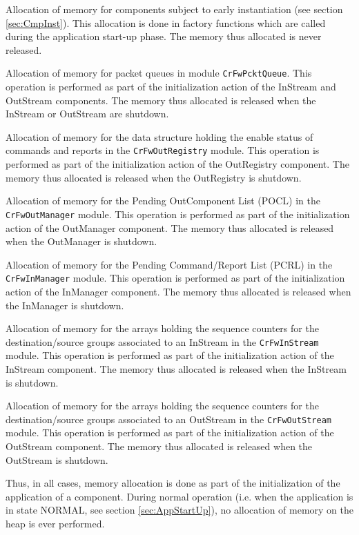 \documentclass[a4paper,10pt]{article}
\newenvironment{fw_itemize}						%
{\begin{itemize}
  \setlength{\itemsep}{1mm}
  \setlength{\parskip}{0pt}
  \setlength{\parsep}{0pt}}
{\end{itemize}}
\begin{document}
\begin{fw_itemize}
\item Allocation of memory for components subject to early instantiation (see section \ref{sec:CmpInst}). This allocation is done in factory functions which are called during the application start-up phase. The memory thus allocated is never released.
\item Allocation of memory for packet queues in module \texttt{CrFwPcktQueue}. This operation is performed as part of the initialization action of the InStream and OutStream components. The memory thus allocated is released when the InStream or OutStream are shutdown.
\item Allocation of memory for the data structure holding the enable status of commands and reports in the \texttt{CrFwOutRegistry} module. This operation is performed as part of the initialization action of the OutRegistry component. The memory thus allocated is released when the OutRegistry is shutdown.
\item Allocation of memory for the Pending OutComponent List (POCL) in the \texttt{CrFwOutManager} module. This operation is performed as part of the initialization action of the OutManager component. The memory thus allocated is released when the OutManager is shutdown.
\item Allocation of memory for the Pending Command/Report List (PCRL) in the \texttt{CrFwInManager} module. This operation is performed as part of the initialization action of the InManager component. The memory thus allocated is released when the InManager is shutdown.
\item Allocation of memory for the arrays holding the sequence counters for the destination/source groups associated to an InStream in the \texttt{CrFwInStream} module. This operation is performed as part of the initialization action of the InStream component. The memory thus allocated is released when the InStream is shutdown.
\item Allocation of memory for the arrays holding the sequence counters for the destination/source groups associated to an OutStream in the \texttt{CrFwOutStream} module. This operation is performed as part of the initialization action of the OutStream component. The memory thus allocated is released when the OutStream is shutdown.
\end{fw_itemize}

Thus, in all cases, memory allocation is done as part of the initialization of the application of a component. During normal operation (i.e. when the application is in state NORMAL, see section \ref{sec:AppStartUp}), no allocation of memory on the heap is ever performed.
\end{document}
